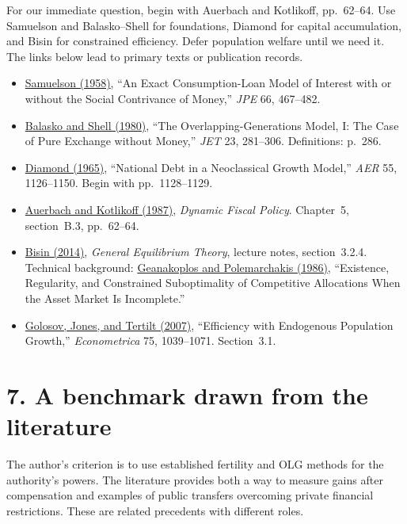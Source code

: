 \documentclass[11pt]{article}
\newcommand{\reading}[2]{\href{#1}{#2}}
\begin{document}
For our immediate question, begin with Auerbach and Kotlikoff, pp.~62--64.
Use Samuelson and Balasko--Shell for foundations, Diamond for capital accumulation,
and Bisin for constrained efficiency. Defer population welfare until we need it.
The links below lead to primary texts or publication records.

{\small
\begin{itemize}
\setlength{\itemsep}{0pt}
\item \reading{https://ludwigbc.com/wp-content/uploads/2013/08/samuelson_overlapping.pdf}{Samuelson (1958)}, ``An Exact Consumption-Loan Model of Interest with or without the Social Contrivance of Money,'' \emph{JPE} 66, 467--482.
\item \reading{https://karlshell.com/wp-content/uploads/2015/03/OGM_1.pdf}{Balasko and Shell (1980)}, ``The Overlapping-Generations Model, I: The Case of Pure Exchange without Money,'' \emph{JET} 23, 281--306. Definitions: p.~286.
\item \reading{https://assets.aeaweb.org/asset-server/files/9443.pdf}{Diamond (1965)}, ``National Debt in a Neoclassical Growth Model,'' \emph{AER} 55, 1126--1150. Begin with pp.~1128--1129.
\item \reading{https://kotlikoff.net/wp-content/uploads/2019/04/Dynamic-Fiscal-Policy.pdf}{Auerbach and Kotlikoff (1987)}, \emph{Dynamic Fiscal Policy}. Chapter~5, section~B.3, pp.~62--64.
\item \reading{https://bpb-us-e1.wpmucdn.com/wp.nyu.edu/dist/c/16384/files/2019/11/Lecture-notes-Oct2014.pdf}{Bisin (2014)}, \emph{General Equilibrium Theory}, lecture notes, section~3.2.4. Technical background: \reading{https://doi.org/10.1017/CBO9780511983566.007}{Geanakoplos and Polemarchakis (1986)}, ``Existence, Regularity, and Constrained Suboptimality of Competitive Allocations When the Asset Market Is Incomplete.''
\item \reading{https://jenni.uchicago.edu/Fertility/Golosov_Jones_Tertilt_2007_Econometrica_v75_n4.pdf}{Golosov, Jones, and Tertilt (2007)}, ``Efficiency with Endogenous Population Growth,'' \emph{Econometrica} 75, 1039--1071. Section~3.1.
\end{itemize}
}
\newpage
\section*{7. A benchmark drawn from the literature}

The author's criterion is to use established fertility and OLG methods for
the authority's powers. The literature provides both a way to measure gains
after compensation and examples of public transfers overcoming private
financial restrictions. These are related precedents with different roles.
\end{document}
